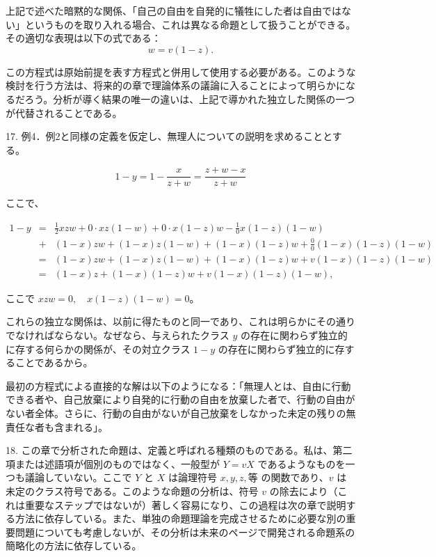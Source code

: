 \documentclass[a4paper,11pt,openany]{ltjsbook}
\begin{document}
上記で述べた暗黙的な関係、「自己の自由を自発的に犠牲にした者は自由ではない」というものを取り入れる場合、これは異なる命題として扱うことができる。その適切な表現は以下の式である：
\[
w = v (1 - z).
\]

この方程式は原始前提を表す方程式と併用して使用する必要がある。このような検討を行う方法は、将来的の章で理論体系の議論に入ることによって明らかになるだろう。分析が導く結果の唯一の違いは、上記で導かれた独立した関係の一つが代替されることである。

17. 例4．例2と同様の定義を仮定し、無理人についての説明を求めることとする。

$$1 - y = 1 - \frac{x}{z+w} = \frac{z + w - x}{z + w}$$

ここで、

\begin{eqnarray*}
1 - y &=& \frac{1}{2} xzw + 0 \cdot xz(1 - w) + 0 \cdot x(1 - z)w - \frac{1}{0} x (1 - z)(1 - w)\\
&+& (1-x)zw + (1-x)z(1-w) + (1-x)(1-z)w + \frac{0}{0}(1-x)(1-z)(1-w)\\
&=& (1-x)zw + (1-x)z(1-w) + (1-x)(1-z)w + v(1-x)(1-z)(1-w)\\
&=& (1-x)z + (1-x)(1-z)w + v(1-x)(1-z)(1-w),
\end{eqnarray*}

ここで $xzw = 0, \quad x(1-z)(1-w) = 0$。

これらの独立な関係は、以前に得たものと同一であり、これは明らかにその通りでなければならない。なぜなら、与えられたクラス $y$ の存在に関わらず独立的に存する何らかの関係が、その対立クラス $1 - y$ の存在に関わらず独立的に存することであるから。

最初の方程式による直接的な解は以下のようになる：「無理人とは、自由に行動できる者や、自己放棄により自発的に行動の自由を放棄した者で、行動の自由がない者全体。さらに、行動の自由がないが自己放棄をしなかった未定の残りの無責任な者も含まれる」。

18. この章で分析された命題は、定義と呼ばれる種類のものである。私は、第二項または述語項が個別のものではなく、一般型が $Y = vX$ であるようなものを一つも議論していない。ここで $Y$ と $X$ は論理符号 $x, y, z, 等$ の関数であり、$v$ は未定のクラス符号である。このような命題の分析は、符号 $v$ の除去により（これは重要なステップではないが）著しく容易になり、この過程は次の章で説明する方法に依存している。また、単独の命題理論を完成させるために必要な別の重要問題についても考慮しないが、その分析は未来のページで開発される命題系の簡略化の方法に依存している。

\newpage
\end{document}
